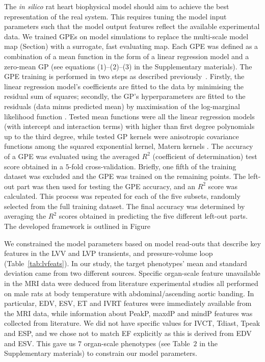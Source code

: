 \vspace{0.2cm}
The \textit{in silico} rat heart biophysical model should aim to achieve the best representation of the real system. This requires tuning the model input parameters such that the model output features reflect the available experimental data. We trained GPEs on model simulations to replace the multi-scale model map (Section) with a surrogate, fast evaluating map. Each GPE was defined as a combination of a mean function in the form of a linear regression model and a zero-mean GP (see equations ($1$)--($2$)--($3$) in the Supplementary materials). The GPE training is performed in two steps as described previously~\cite{Vernon:2010,Vernon:2018}. Firstly, the linear regression model's coefficients are fitted to the data by minimising the residual sum of squares; secondly, the GP's hyperparameters are fitted to the residuals (data minus predicted mean) by maximisation of the log-marginal likelihood function . Tested mean functions were all the linear regression models (with intercept and interaction terms) with higher than first degree polynomials up to the third degree, while tested GP kernels were anisotropic covariance functions among the squared exponential kernel, Matern kernels . The accuracy of a GPE was evaluated using the averaged $R^2$ (coefficient of determination) test score obtained in a $5$-fold cross-validation. Briefly, one fifth of the training dataset was excluded and the GPE was trained on the remaining points. The left-out part was then used for testing the GPE accuracy, and an $R^2$ score was calculated. This process was repeated for each of the five subsets, randomly selected from the full training dataset. The final accuracy was determined by averaging the $R^2$ scores obtained in predicting the five different left-out parts. The developed framework is outlined in Figure


\vspace{0.2cm}
We constrained the model parameters based on model read-outs that describe key features in the LVV and LVP transients, and pressure-volume loop (Table~\ref{tab:lvfeats}). In our study, the target phenotypes' mean and standard deviation came from two different sources. Specific organ-scale feature unavailable in the MRI data \cite{Roe:2017} were deduced from literature experimental studies all performed on male rats at body temperature with abdominal/ascending aortic banding. In particular, EDV, ESV, ET and IVRT features were immediately available from the MRI data, while information about PeakP, maxdP and mindP features was collected from literature. We did not have specific values for IVCT, Tdiast, Tpeak and ESP, and we chose not to match EF explicitly as this is derived from EDV and ESV. This gave us $7$ organ-scale phenotypes (see Table~$2$ in the Supplementary materials) to constrain our model parameters.


